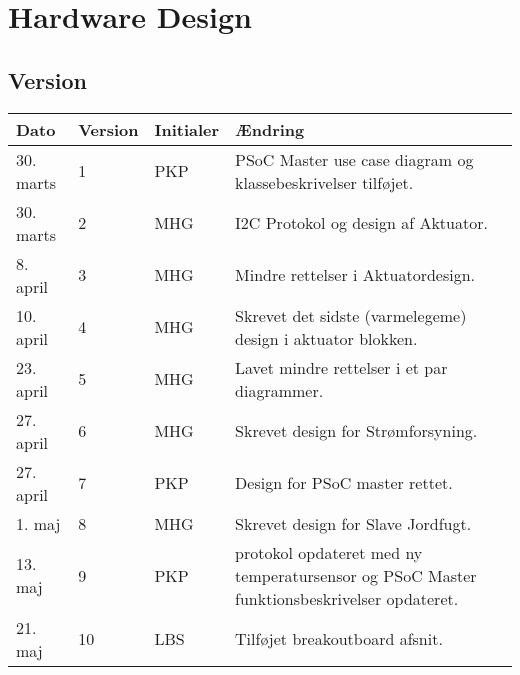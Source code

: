 \chapter{Hardware Design} \label{ch:HwDesign}

\section*{Version}
\begin{table}[h]
	\centering
	\begin{tabularx}{\textwidth - 2cm}{|l|l|l|X|}
	\hline
	Dato	& Version	& Initialer & Ændring	\\ \hline
	30. marts & 1 & PKP & PSoC Master use case diagram og klassebeskrivelser tilføjet.\\ \hline
	30. marts & 2 & MHG & I2C Protokol og design af Aktuator. \\ \hline
	8. april & 3 & MHG & Mindre rettelser i Aktuatordesign. \\ \hline
	10. april & 4 & MHG & Skrevet det sidste (varmelegeme) design i aktuator blokken. \\\hline
	23. april & 5 & MHG & Lavet mindre rettelser i et par diagrammer. \\\hline
	27. april & 6 & MHG & Skrevet design for Strømforsyning. \\\hline
	27. april & 7 & PKP & Design for PSoC master rettet.	\\\hline
	1. maj & 8 & MHG & Skrevet design for Slave Jordfugt. \\\hline
	13. maj & 9 & PKP & \IIC protokol opdateret med ny temperatursensor og PSoC Master funktionsbeskrivelser opdateret. \\\hline
	21. maj & 10 & LBS & Tilføjet breakoutboard afsnit. \\\hline
	\end{tabularx}
\end{table}

\clearpage



	

